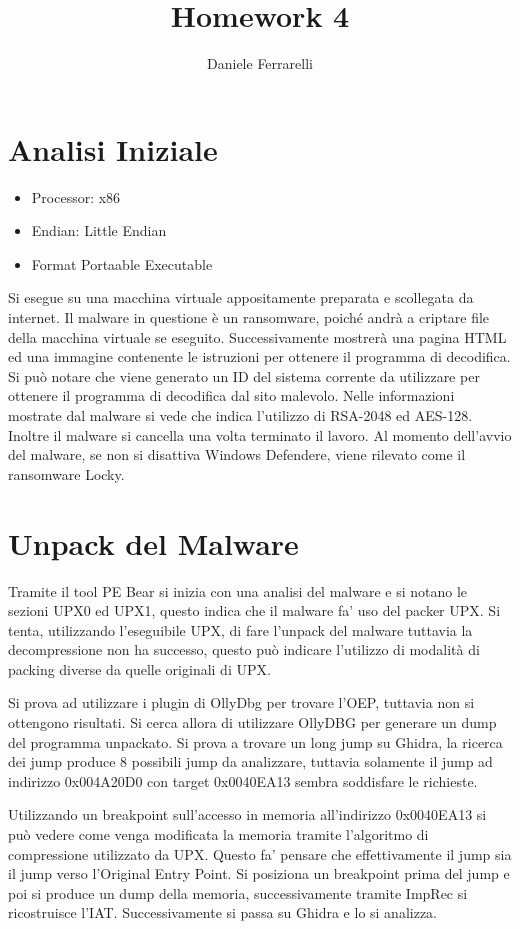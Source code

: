 \documentclass[a4paper,12pt]{article}
\title{Homework 4}
\author{Daniele Ferrarelli}
\date{}
\begin{document}
\maketitle
\tableofcontents

\section{Analisi Iniziale}
\begin{itemize}
	\item Processor: x86
	\item Endian: Little Endian
	\item Format Portaable Executable
\end{itemize}

Si esegue su una macchina virtuale appositamente preparata e scollegata  da internet. Il malware in questione è un ransomware, poiché andrà a criptare file della macchina virtuale se eseguito. Successivamente mostrerà una pagina HTML ed una immagine contenente le istruzioni per ottenere il programma di decodifica. Si può notare che viene generato un ID del sistema corrente da utilizzare per ottenere il programma di decodifica dal sito malevolo. Nelle informazioni mostrate dal malware si vede che indica l'utilizzo di RSA-2048 ed AES-128.  Inoltre il malware si cancella una volta terminato il lavoro. Al momento dell'avvio del malware, se non si disattiva Windows Defendere, viene rilevato come il ransomware Locky. 

\section{Unpack del Malware}
Tramite il tool PE Bear si inizia con una analisi del malware e si notano le sezioni UPX0 ed UPX1, questo indica che il malware fa' uso del packer UPX. Si tenta, utilizzando l'eseguibile UPX, di fare l'unpack del malware tuttavia la decompressione non ha successo, questo può indicare l'utilizzo di modalità di packing diverse da quelle originali di UPX.

Si prova ad utilizzare i plugin di OllyDbg per trovare l'OEP, tuttavia non si ottengono risultati.
Si cerca allora di utilizzare OllyDBG per generare un dump del programma unpackato. Si prova a trovare un long jump su Ghidra, la ricerca dei jump produce 8 possibili jump da analizzare, tuttavia solamente il jump ad indirizzo 0x004A20D0 con target 0x0040EA13 sembra soddisfare le richieste. 

Utilizzando un breakpoint sull'accesso in memoria all'indirizzo 0x0040EA13 si può vedere come venga modificata la memoria tramite l'algoritmo di compressione utilizzato da UPX. Questo fa' pensare che effettivamente il jump sia il jump verso l'Original Entry Point. Si posiziona un breakpoint prima del jump e poi si produce un dump della memoria, successivamente tramite ImpRec si ricostruisce l'IAT.
Successivamente si passa su Ghidra e lo si analizza.
\end{document}
